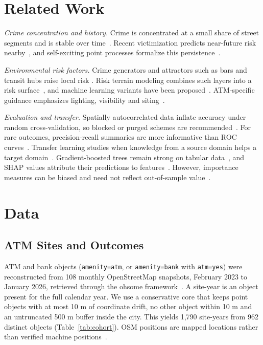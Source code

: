 \documentclass[conference]{IEEEtran}
\begin{document}
\section{Related Work}
\textit{Crime concentration and history.} Crime is concentrated at a small share of street segments and is stable
over time~\cite{weisburd2015}. Recent victimization predicts near-future risk nearby~\cite{johnson2004}, and
self-exciting point processes formalize this persistence~\cite{mohler2011}.

\textit{Environmental risk factors.} Crime generators and attractors such as bars and transit hubs raise local risk
\cite{brantingham1995}. Risk terrain modeling combines such layers into a risk surface~\cite{caplan2011}, and machine
learning variants have been proposed~\cite{wheeler2021}. ATM-specific guidance emphasizes lighting, visibility and
siting~\cite{scott2001}.

\textit{Evaluation and transfer.} Spatially autocorrelated data inflate accuracy under random cross-validation, so
blocked or purged schemes are recommended~\cite{roberts2017}. For rare outcomes, precision-recall summaries are more
informative than ROC curves~\cite{saito2015}. Transfer learning studies when knowledge from a source domain helps a
target domain~\cite{pan2010}. Gradient-boosted trees remain strong on tabular data~\cite{ke2017,grinsztajn2022}, and
SHAP values attribute their predictions to features~\cite{lundberg2017}. However, importance measures can be biased
and need not reflect out-of-sample value~\cite{strobl2007}.

\section{Data}
\subsection{ATM Sites and Outcomes}
ATM and bank objects (\texttt{amenity=atm}, or \texttt{amenity=bank} with \texttt{atm=yes}) were reconstructed from
108 monthly OpenStreetMap snapshots, February 2023 to January 2026, retrieved through the ohsome
framework~\cite{raifer2019}. A site-year is an object present for the full calendar year. We use a conservative core
that keeps point objects with at most 10 m of coordinate drift, no other object within 10 m and an untruncated 500 m
buffer inside the city. This yields 1,790 site-years from 962 distinct objects (Table~\ref{tab:cohort}). OSM
positions are mapped locations rather than verified machine positions~\cite{haklay2010}.
\end{document}
